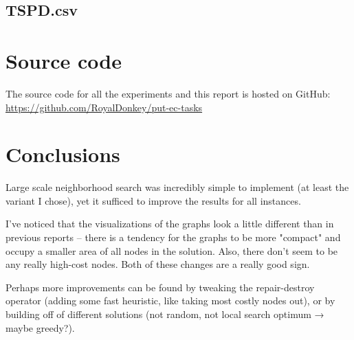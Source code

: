 \documentclass[14pt]{article}
\begin{document}
\subsection{TSPD.csv}

\section{Source code}
The source code for all the experiments and this report is hosted on GitHub: \\
\url{https://github.com/RoyalDonkey/put-ec-tasks}

\section{Conclusions}
Large scale neighborhood search was incredibly simple to implement (at least
the variant I chose), yet it sufficed to improve the results for all instances.

I've noticed that the visualizations of the graphs look a little different than in
previous reports -- there is a tendency for the graphs to be more "compact" and
occupy a smaller area of all nodes in the solution. Also, there don't seem to
be any really high-cost nodes. Both of these changes are a really good sign.


Perhaps more improvements can be found by tweaking the repair-destroy operator
(adding some fast heuristic, like taking most costly nodes out), or by building
off of different solutions (not random, not local search optimum → maybe
greedy?).
\end{document}
